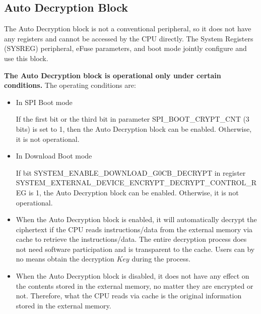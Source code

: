 \documentclass[main\_\_EN.tex]{subfiles}
\begin{document}
\subsection{Auto Decryption Block}

The Auto Decryption block is not a conventional peripheral, so it does not have any registers and cannot be accessed by the CPU directly. The System Registers (SYSREG) peripheral, eFuse parameters, and boot mode jointly configure and use this block.

\textbf{The Auto Decryption block is operational only under certain conditions.} The operating conditions are:

\begin{itemize}

    \item In SPI Boot mode

    If the first bit or the third bit in parameter SPI\_BOOT\_CRYPT\_CNT (3 bits) is set to 1, then the Auto Decryption block can be enabled. Otherwise, it is not operational.

    \item In Download Boot mode

    If bit SYSTEM\_ENABLE\_DOWNLOAD\_G0CB\_DECRYPT in register SYSTEM\_EXTERNAL\_DEVICE\_ENCRYPT\_DECRYPT\_CONTROL\_REG is 1, the Auto Decryption block can be enabled. Otherwise, it is not operational.

\end{itemize}

\begin{tiplisting}
\vspace{-2em}
\begin{itemize}

\item When the Auto Decryption block is enabled, it will automatically decrypt the ciphertext if the CPU reads instructions/data from the external memory via cache to retrieve the instructions/data. The entire decryption process does not need software participation and is transparent to the cache. Users can by no means obtain the decryption \begin{math}Key\end{math} during the process.

\item When the Auto Decryption block is disabled, it does not have any effect on the contents stored in the external memory, no matter they are encrypted or not. Therefore, what the CPU reads via cache is the original information stored in the external memory.

\end{itemize}
\end{tiplisting}
\end{document}
